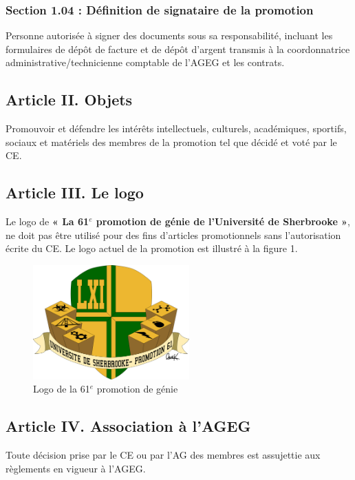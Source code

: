 \subsubsection*{Section 1.04 : Définition de signataire de la promotion}
Personne autorisée à signer des documents sous sa responsabilité, incluant les formulaires de dépôt de facture et de dépôt d'argent transmis à la coordonnatrice administrative/technicienne comptable de l'AGEG et les contrats.

\subsection*{Article II. Objets}
Promouvoir et défendre les intérêts intellectuels, culturels, académiques, sportifs, sociaux et matériels des membres de la promotion tel que décidé et voté par le CE.

\subsection*{Article III. Le logo}
Le logo de \textbf{« La 61$^e$ promotion de génie de l’Université de Sherbrooke »}, ne doit pas être utilisé pour des fins d’articles promotionnels sans l’autorisation écrite du CE. Le logo actuel de la promotion est illustré à la figure 1.

\begin{figure}[H]
\begin{center}
\includegraphics[width=6cm]{LOGO61.png}
\caption{Logo de la 61$^e$ promotion de génie}
\end{center}
\end{figure}

\subsection*{Article IV. Association à l'AGEG}
Toute décision prise par le CE ou par l’AG des membres est assujettie aux règlements en vigueur à l’AGEG.


